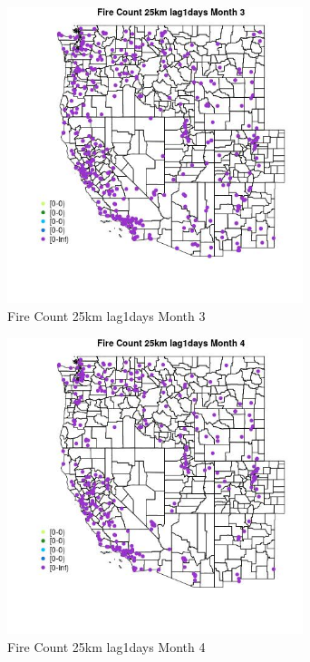 \begin{figure} 
\centering  
\includegraphics[width=0.77\textwidth]{Code_Outputs/Report_ML_input_PM25_Step4_part_e_de_duplicated_aves_compiled_2019-05-18wNAs_MapObsMo3Fire_Count_25km_lag1days.jpg} 
\caption{\label{fig:Report_ML_input_PM25_Step4_part_e_de_duplicated_aves_compiled_2019-05-18wNAsMapObsMo3Fire_Count_25km_lag1days}Fire Count 25km lag1days Month 3} 
\end{figure} 
 

\begin{figure} 
\centering  
\includegraphics[width=0.77\textwidth]{Code_Outputs/Report_ML_input_PM25_Step4_part_e_de_duplicated_aves_compiled_2019-05-18wNAs_MapObsMo4Fire_Count_25km_lag1days.jpg} 
\caption{\label{fig:Report_ML_input_PM25_Step4_part_e_de_duplicated_aves_compiled_2019-05-18wNAsMapObsMo4Fire_Count_25km_lag1days}Fire Count 25km lag1days Month 4} 
\end{figure} 
 

